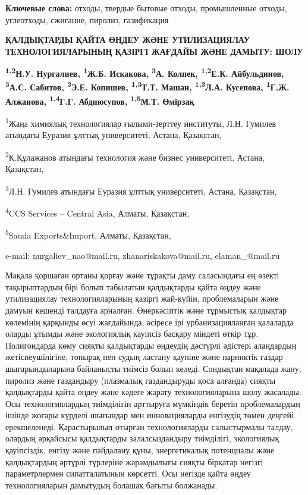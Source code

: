 {\bfseries Ключевые слова:} отходы, твердые бытовые отходы, промышленные
отходы, углеотходы, сжигание, пиролиз, газификация

\begin{articleheader}
{\bfseries ҚАЛДЫҚТАРДЫ ҚАЙТА ӨҢДЕУ ЖӘНЕ УТИЛИЗАЦИЯЛАУ ТЕХНОЛОГИЯЛАРЫНЫҢ ҚАЗІРГІ ЖАҒДАЙЫ ЖӘНЕ ДАМЫТУ: ШОЛУ}

{\bfseries
\textsuperscript{1,2}Н.У. Нургалиев\textsuperscript{\envelope },
\textsuperscript{1}Ж.Б. Искакова\textsuperscript{\envelope },
\textsuperscript{3}А. Колпек,
\textsuperscript{1,2}Е.К. Айбульдинов\textsuperscript{\envelope },
\textsuperscript{3}А.С. Сабитов,
\textsuperscript{3}Э.Е. Копишев,
\textsuperscript{1,3}Т.Т. Машан,
\textsuperscript{1,3}Л.А. Кусепова,
\textsuperscript{1}Г.Ж. Алжанова,
\textsuperscript{1,4}Г.Г. Абдиюсупов,
\textsuperscript{1,5}М.Т. Өмірзақ
}
\end{articleheader}

\begin{articleheader}
\textsuperscript{1}Жаңа химиялық технологиялар ғылыми-зерттеу институты, Л.Н. Гумилев атындағы Еуразия ұлттық университеті, Астана, Қазақстан,

\textsuperscript{2}Қ.Құлажанов атындағы технология және бизнес университеті, Астана, Қазақстан,

\textsuperscript{3}Л.Н. Гумилев атындағы Еуразия ұлттық университеті, Астана, Қазақстан,

\textsuperscript{4}CCS Services -- Central Asia, Алматы, Қазақстан,

\textsuperscript{5}Sauda Exports\&Import, Алматы, Қазақстан,

e-mail: nurgaliev\_nao@mail.ru, zhanariskakova@mail.ru, elaman\_@mail.ru
\end{articleheader}

Мақала қоршаған ортаны қорғау және тұрақты даму саласындағы ең өзекті
тақырыптардың бірі болып табылатын қалдықтарды қайта өңдеу және
утилизациялау технологияларының қазіргі жай-күйін, проблемаларын және
дамуын кешенді талдауға арналған. Өнеркәсіптік және тұрмыстық қалдықтар
көлемінің қарқынды өсуі жағдайында, әсіресе ірі урбанизацияланған
қалаларда оларды ұтымды және экологиялық қауіпсіз басқару міндеті өткір
тұр. Полигондарда көму сияқты қалдықтарды өңдеудің дәстүрлі әдістері
алаңдардың жетіспеушілігіне, топырақ пен судың ластану қаупіне және
парниктік газдар шығарындыларына байланысты тиімсіз болып келеді.
Сондықтан мақалада жану, пиролиз және газдандыру (плазмалық газдандыруды
қоса алғанда) сияқты қалдықтарды қайта өңдеу және кәдеге жарату
технологияларына шолу жасалады. Осы технологиялардың тиімділігін
арттыруға мүмкіндік беретін проблемалардың ішінде жоғары күрделі
шығындар мен инновацияларды енгізудің төмен деңгейі ерекшеленеді.
Қарастырылып отырған технологияларды салыстырмалы талдау, олардың
әрқайсысы қалдықтарды залалсыздандыру тиімділігі, экологиялық
қауіпсіздік, енгізу және пайдалану құны, энергетикалық потенциалы және
қалдықтардың әртүрлі түрлеріне жарамдылығы сияқты бірқатар негізгі
параметрлермен сипатталатынын көрсетті. Осы негізде қайта өңдеу
технологияларын дамытудың болашақ бағыты болжанады.

